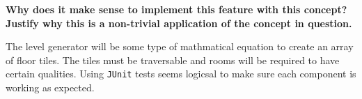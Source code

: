 \documentclass[12pt]{article}
\begin{document}
\begin{enumerate}[leftmargin=\labelsep]
    \textbf{Why does it make sense to implement this feature with this concept?
      Justify why this is a non-trivial application of the concept in question.
    }


    The level generator will be some type of mathmatical equation to create an
    array of floor tiles. The tiles must be traversable and rooms will be
    required to have certain qualities. Using \texttt{JUnit} tests seems
    logicsal to make sure each component is working as expected.
    
  \end{enumerate}
\end{document}
